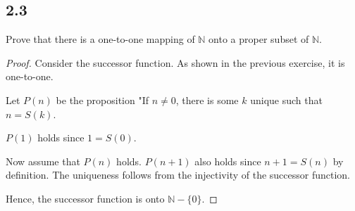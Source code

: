 \subsection*{2.3} Prove that there is a one-to-one mapping of $\mathbb{N}$ onto a proper subset of $\mathbb{N}$.

\begin{proof}
Consider the successor function. As shown in the previous exercise, it is one-to-one.

Let $P(n)$ be the proposition "If $n \neq 0$, there is some $k$ unique such that $n = S(k)$.

$P(1)$ holds since $1 = S(0)$.

Now assume that $P(n)$ holds. $P(n+1)$ also holds since $n+1 = S(n)$ by definition. The uniqueness follows from the injectivity of the successor function.

Hence, the successor function is onto $\mathbb{N} - \{0\}$.
\end{proof}

